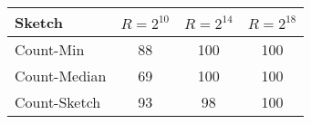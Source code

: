 \begin{tabular}{lccc}
\toprule
Sketch & $R=2^{10}$ & $R=2^{14}$ & $R=2^{18}$ \\
\midrule
Count-Min & 88 & 100 & 100 \\
Count-Median & 69 & 100 & 100 \\
Count-Sketch & 93 & 98 & 100 \\
\bottomrule
\end{tabular}